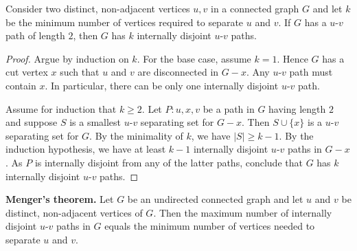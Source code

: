 \begin{lemma}
Consider two distinct, non-adjacent vertices $u,v$ in a connected
graph $G$ and let $k$ be the minimum number of vertices required to
separate $u$ and $v$. If $G$ has a $u$-$v$ path of length $2$, then
$G$ has $k$ internally disjoint $u$-$v$ paths.
\end{lemma}

\begin{proof}
Argue by induction on $k$. For the base case, assume $k = 1$. Hence
$G$ has a cut vertex $x$ such that $u$ and $v$ are disconnected in
$G - x$. Any $u$-$v$ path must contain $x$. In particular, there can
be only one internally disjoint $u$-$v$ path.

Assume for induction that $k \geq 2$. Let $P: u,x,v$ be a path in $G$
having length $2$ and suppose $S$ is a smallest $u$-$v$ separating set
for $G - x$. Then $S \cup \{x\}$ is a $u$-$v$ separating set for
$G$. By the minimality of $k$, we have $|S| \geq k - 1$. By the
induction hypothesis, we have at least $k - 1$ internally disjoint
$u$-$v$ paths in $G - x$. As $P$ is internally disjoint from any of
the latter paths, conclude that $G$ has $k$ internally disjoint
$u$-$v$ paths.
\end{proof}

\begin{theorem}
\label{thm:distance_connectivity:Menger_theorem}
\textbf{Menger's theorem.}
Let $G$ be an undirected connected graph and let $u$ and $v$ be
distinct, non-adjacent vertices of $G$. Then the maximum number of
internally disjoint $u$-$v$ paths in $G$ equals the minimum number of
vertices needed to separate $u$ and $v$.
\end{theorem}

